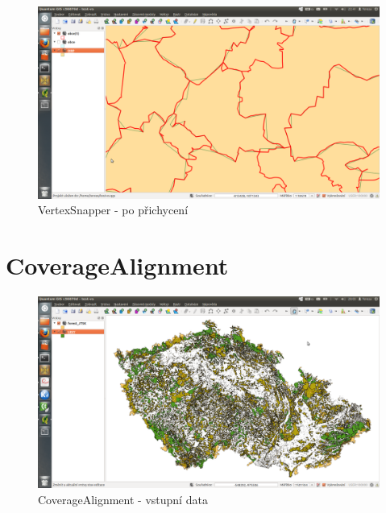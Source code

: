   \begin{figure}[H]
    \centering
      \includegraphics[width=400pt]{./pictures/test-vs3.png}
      \caption{VertexSnapper - po přichycení}
      \label{fig:vs3}
  \end{figure}


\section{CoverageAlignment}
\label{ukazky-ca}

  \begin{figure}[H]
    \centering
      \includegraphics[width=400pt]{./pictures/test-ca1.png}
      \caption{CoverageAlignment - vstupní data}
      \label{fig:ca1}
  \end{figure}

